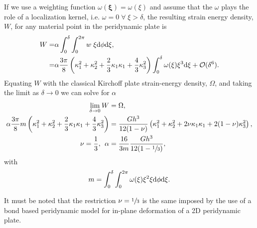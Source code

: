 \documentclass[preprint,review,12pt]{elsarticle}
\begin{document}
%
If we use a weighting function \(\omega(\boldsymbol{\xi})=\omega(\xi)\) and assume that the $\omega$ plays the role of a localization kernel, i.e. $\omega = 0 \; \forall \; \xi > \delta$, the resulting strain energy density, $W$, for any material point in the peridynamic plate is
%
\begin{align}
    W =& \alpha \int_{0}^\delta\int_0^{2 \pi} w\; \xi {\rm d}\phi {\rm d}\xi ,\notag \\
    =& \alpha \frac{3\pi}{8} \left(\kappa_1^2+\kappa_2^2+\frac{2}{3}\kappa_1\kappa_1+\frac{4}{3}\kappa_3^2 \right)\int_{0}^\delta \omega(\xi)\xi^3{\rm d}\xi + \mathcal{O}(\delta^6).\notag 
\end{align}
%
Equating $W$ with the classical Kirchoff plate strain-energy density, $\Omega$, and taking the limit as $\delta \to 0$ we can solve for $\alpha$
%
\begin{align}
    \lim_{\delta \to 0}  W &= \Omega, \notag \\
    \alpha \frac{3 \pi}{8} m \left(\kappa_1^2+\kappa_2^2+\frac{2}{3}\kappa_1\kappa_1+\frac{4}{3}\kappa_3^2 \right)&= \frac{G h^3}{12(1-\nu)} \left(\kappa_1^2+\kappa_2^2+2\nu\kappa_1\kappa_1+2(1-\nu)\kappa_3^2 \right), \notag \\
    \nu = \frac{1}{3},\:\: \alpha &= \frac{16}{3 m} \frac{G h^3}{12(1-\sfrac{1}{3})},
\label{eq:alpha}
\end{align}
%
with 
\begin{equation}
    m = \int_{0}^{\delta} \int_{0}^{2\pi}\omega(\xi) \xi^2 \xi {\rm d}\phi {\rm d}\xi \notag.
\end{equation}

It must be noted that the restriction \(\nu=\sfrac{1}{3}\) is the same imposed by the use of a bond based peridynamic model for in-plane deformation of a 2D peridynamic plate.
\end{document}
